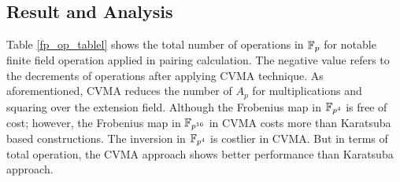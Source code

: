 \subsection{Result and Analysis}
Table \ref{fp_op_tablel} shows the total number of operations in ${\mathbb{F}}_{p}$ for notable finite field operation applied in pairing calculation. 
The negative value refers to the decrements of operations after applying CVMA technique.
As aforementioned, CVMA reduces the number of $A_p$ for multiplications and squaring over the extension field.
Although the Frobenius map in $\mathbb{F}_{p^4}$ is free of cost; however, the Frobenius map in $\mathbb{F}_{p^{16}}$ in CVMA costs more than  Karatsuba based constructions.
The inversion in $\mathbb{F}_{p^4}$ is costlier in CVMA. 
But in terms of total operation, the CVMA approach shows better performance than Karatsuba approach.
\renewcommand{\baselinestretch}{1.2}
